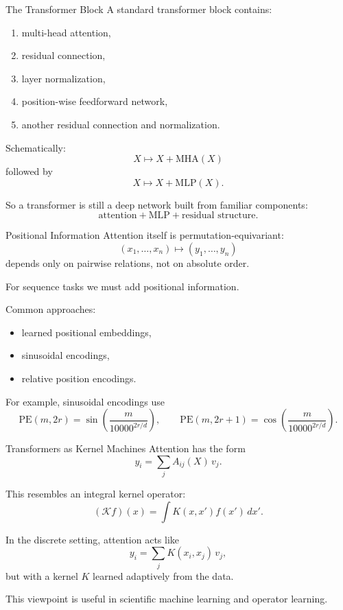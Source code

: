 \documentclass{beamer}
\begin{document}
\begin{frame}{The Transformer Block}
  A standard transformer block contains:

  \begin{enumerate}
  \item multi-head attention,
  \item residual connection,
  \item layer normalization,
  \item position-wise feedforward network,
  \item another residual connection and normalization.
  \end{enumerate}

  Schematically:
  \[
  X \mapsto X + \mathrm{MHA}(X)
  \]
  followed by
  \[
  X \mapsto X + \mathrm{MLP}(X).
  \]

  So a transformer is still a deep network built from familiar components:
  \[
  \text{attention} + \text{MLP} + \text{residual structure}.
  \]
\end{frame}

\begin{frame}{Positional Information}
  Attention itself is permutation-equivariant:
  \[
  (x_1,\dots,x_n)\mapsto (y_1,\dots,y_n)
  \]
  depends only on pairwise relations, not on absolute order.

  For sequence tasks we must add positional information.

  Common approaches:
  \begin{itemize}
  \item learned positional embeddings,
  \item sinusoidal encodings,
  \item relative position encodings.
  \end{itemize}

  For example, sinusoidal encodings use
  \[
  \mathrm{PE}(m,2r)=\sin\!\left(\frac{m}{10000^{2r/d}}\right),
  \qquad
  \mathrm{PE}(m,2r+1)=\cos\!\left(\frac{m}{10000^{2r/d}}\right).
  \]
\end{frame}

\begin{frame}{Transformers as Kernel Machines}
  Attention has the form
  \[
  y_i = \sum_j A_{ij}(X)\, v_j.
  \]

  This resembles an integral kernel operator:
  \[
  (\mathcal{K}f)(x)
  =
  \int K(x,x') f(x')\, dx'.
  \]

  In the discrete setting, attention acts like
  \[
  y_i = \sum_j K(x_i,x_j)\, v_j,
  \]
  but with a kernel \(K\) learned adaptively from the data.

  This viewpoint is useful in scientific machine learning and operator learning.
\end{frame}
\end{document}

